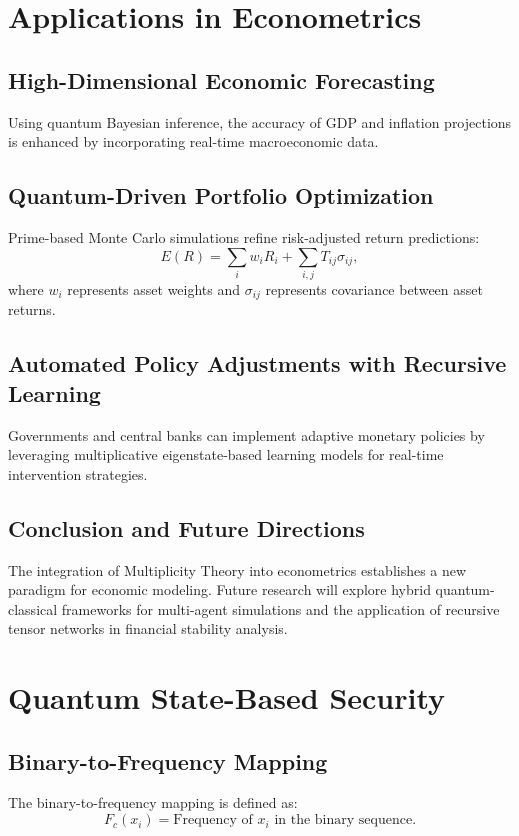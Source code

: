\documentclass{article}
\theoremstyle{plain}
\begin{document}
\begin{itemize}
\begin{itemize}
\section{Applications in Econometrics}

\subsection{High-Dimensional Economic Forecasting}
Using quantum Bayesian inference, the accuracy of GDP and inflation projections is enhanced by incorporating real-time macroeconomic data.

\subsection{Quantum-Driven Portfolio Optimization}
Prime-based Monte Carlo simulations refine risk-adjusted return predictions:
\begin{equation}
    E(R) = \sum_i w_i R_i + \sum_{i,j} T_{ij} \sigma_{ij},
\end{equation}
where $w_i$ represents asset weights and $\sigma_{ij}$ represents covariance between asset returns.

\subsection{Automated Policy Adjustments with Recursive Learning}
Governments and central banks can implement adaptive monetary policies by leveraging multiplicative eigenstate-based learning models for real-time intervention strategies.

\subsection{Conclusion and Future Directions}
The integration of Multiplicity Theory into econometrics establishes a new paradigm for economic modeling. Future research will explore hybrid quantum-classical frameworks for multi-agent simulations and the application of recursive tensor networks in financial stability analysis.


\section{Quantum State-Based Security}

\subsection{Binary-to-Frequency Mapping}
The binary-to-frequency mapping is defined as:
\begin{equation}
F_c(x_i) = \text{Frequency of } x_i \text{ in the binary sequence.}
\end{equation}


\end{itemize}
\end{itemize}
\end{document}
